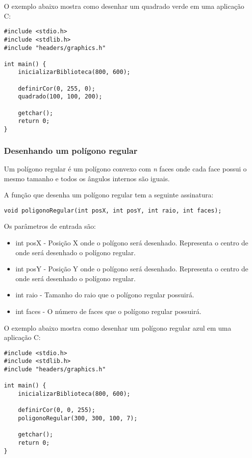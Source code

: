 \documentclass[12pt, %
openright,
oneside, %
a4paper,    %
brazil]{facom-ufu-abntex2}
\begin{document}
O exemplo abaixo mostra como desenhar um quadrado verde em uma aplicação C:

\begin{lstlisting}
#include <stdio.h>
#include <stdlib.h>
#include "headers/graphics.h"

int main() {
    inicializarBiblioteca(800, 600);

    definirCor(0, 255, 0);
    quadrado(100, 100, 200);

    getchar();
    return 0;
}
\end{lstlisting}

\subsubsection{Desenhando um polígono regular}
Um polígono regular é um polígono convexo com \textit{n} faces onde cada face possui o mesmo tamanho e todos os ângulos internos são iguais.

A função que desenha um polígono regular tem a seguinte assinatura:

\begin{lstlisting}
void poligonoRegular(int posX, int posY, int raio, int faces);
\end{lstlisting}

Os parâmetros de entrada são:

\begin{itemize}
    \item int posX - Posição X onde o polígono será desenhado. Representa o centro de onde será desenhado o polígono regular.
    \item int posY - Posição Y onde o polígono será desenhado. Representa o centro de onde será desenhado o polígono regular.
    \item int raio - Tamanho do raio que o polígono regular possuirá.
    \item int faces - O número de faces que o polígono regular possuirá.
\end{itemize}

O exemplo abaixo mostra como desenhar um polígono regular azul em uma aplicação C:

\begin{lstlisting}
#include <stdio.h>
#include <stdlib.h>
#include "headers/graphics.h"

int main() {
    inicializarBiblioteca(800, 600);

    definirCor(0, 0, 255);
    poligonoRegular(300, 300, 100, 7);

    getchar();
    return 0;
}
\end{lstlisting}
\end{document}
